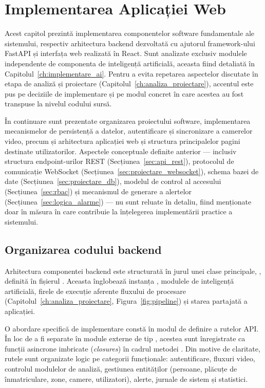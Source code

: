 \documentclass[../../main.tex]{subfiles}
\begin{document}
\chapter{Implementarea Aplicației Web}
\label{ch:implementare_web}

Acest capitol prezintă implementarea componentelor software fundamentale ale sistemului, respectiv arhitectura backend dezvoltată cu ajutorul framework-ului FastAPI și interfața web realizată în React. Sunt analizate exclusiv modulele independente de componenta de inteligență artificială, aceasta fiind detaliată în Capitolul~\ref{ch:implementare_ai}. Pentru a evita repetarea aspectelor discutate în etapa de analiză și proiectare (Capitolul~\ref{ch:analiza_proiectare}), accentul este pus pe deciziile de implementare și pe modul concret în care acestea au fost transpuse la nivelul codului sursă.

În continuare sunt prezentate organizarea proiectului software, implementarea mecanismelor de persistență a datelor, autentificare și sincronizare a camerelor video, precum și arhitectura aplicației web și structura principalelor pagini destinate utilizatorilor. Aspectele conceptuale definite anterior — inclusiv structura endpoint-urilor REST (Secțiunea~\ref{sec:api_rest}), protocolul de comunicație WebSocket (Secțiunea~\ref{sec:proiectare_websocket}), schema bazei de date (Secțiunea~\ref{sec:proiectare_db}), modelul de control al accesului (Secțiunea~\ref{sec:rbac}) și mecanismul de generare a alertelor (Secțiunea~\ref{sec:logica_alarme}) — nu sunt reluate în detaliu, fiind menționate doar în măsura în care contribuie la înțelegerea implementării practice a sistemului.


\section{Organizarea codului backend}
\label{sec:backend_fastapi}

Arhitectura componentei backend este structurată în jurul unei clase principale, , definită în fișierul . Aceasta înglobează instanța , modulele de inteligență artificială, firele de execuție aferente fluxului de procesare (Capitolul~\ref{ch:analiza_proiectare}, Figura~\ref{fig:pipeline}) și starea partajată a aplicației.

O abordare specifică de implementare constă în modul de definire a rutelor API. În loc de a fi separate în module externe de tip , acestea sunt înregistrate ca funcții asincrone imbricate (\emph{closures}) în cadrul metodei . Din motive de claritate, rutele sunt organizate logic pe categorii funcționale: autentificare, fluxuri video, controlul modulelor de analiză, gestiunea entităților (persoane, plăcuțe de înmatriculare, zone, camere, utilizatori), alerte, jurnale de sistem și statistici.
\end{document}
